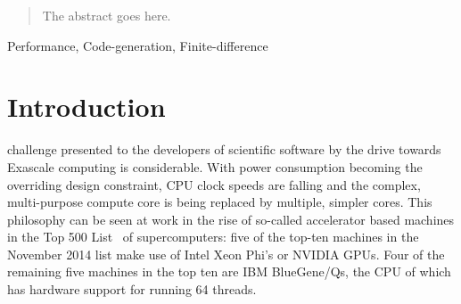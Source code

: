 \documentclass[journal]{IEEEtran}
\begin{document}

\maketitle

\begin{abstract}
The abstract goes here.
\end{abstract}

\begin{IEEEkeywords}
Performance, Code-generation, Finite-difference
\end{IEEEkeywords}



%
\IEEEpeerreviewmaketitle


\section{Introduction}
% 
% 
% 
% 
 challenge presented to the developers of
scientific software by the drive towards Exascale computing is
considerable. With power consumption becoming the overriding design
constraint, CPU clock speeds are falling and the complex,
multi-purpose compute core is being replaced by multiple, simpler
cores. This philosophy can be seen at work in the rise of so-called
accelerator based machines in the Top 500 List~\cite{top500} of
supercomputers: five of the top-ten machines in the November 2014 list
make use of Intel Xeon Phi's or NVIDIA GPUs. Four of the remaining
five machines in the top ten are IBM BlueGene/Qs, the CPU of which has
hardware support for running 64 threads.
\end{document}
